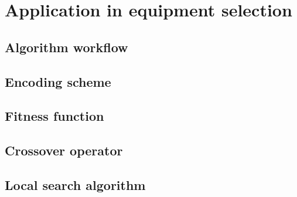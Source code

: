 \section{Application in equipment selection}
\subsection{Algorithm workflow}


\subsection{Encoding scheme}


\subsection{Fitness function}


\subsection{Crossover operator}




\subsection{Local search algorithm}





